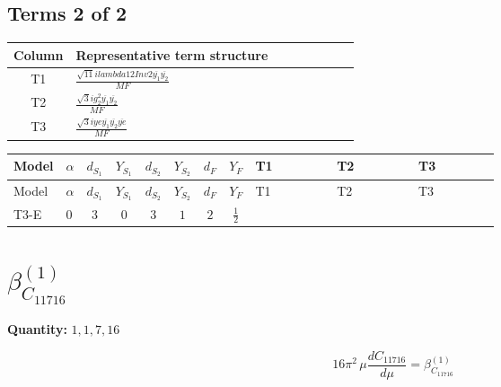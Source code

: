 \documentclass[8pt]{article}
\begin{document}
\begin{landscape}
\subsection*{Terms 2 of 2}
\begin{center}
\begin{tabular}{@{}c >{\raggedright\arraybackslash}p{0.82\linewidth}@{}}
\toprule
Column & Representative term structure \\
\midrule
T1 & \(\displaystyle \frac{\sqrt{11} i lambda12Inv2 \overline{y_{1}} \overline{y_{2}}}{MF}\) \\
\midrule
T2 & \(\displaystyle \frac{\sqrt{3} i g_{2}^{2} \overline{y_{1}} \overline{y_{2}}}{MF}\) \\
\midrule
T3 & \(\displaystyle \frac{\sqrt{3} i ye \overline{y_{1}} \overline{y_{2}} \overline{ye}}{MF}\) \\
\midrule
\bottomrule
\end{tabular}
\end{center}
\smallskip
\tiny
\begin{longtable}{@{}llcccccc >{\raggedright\arraybackslash}p{0.21\linewidth} >{\raggedright\arraybackslash}p{0.21\linewidth} >{\raggedright\arraybackslash}p{0.21\linewidth}@{}}
\toprule
Model & $\alpha$ & $d_{S_1}$ & $Y_{S_1}$ & $d_{S_2}$ & $Y_{S_2}$ & $d_F$ & $Y_F$ & T1 & T2 & T3 \\
\midrule
\endfirsthead
\toprule
Model & $\alpha$ & $d_{S_1}$ & $Y_{S_1}$ & $d_{S_2}$ & $Y_{S_2}$ & $d_F$ & $Y_F$ & T1 & T2 & T3 \\
\midrule
\endhead
T3-E & $0$ & $3$ & $0$ & $3$ & $1$ & $2$ & $\frac{1}{2}$ & \scriptsize\adjustbox{max width=\linewidth}{$\begin{gathered} \frac{3 \sqrt{11} i lambda12Inv2 \overline{y_{1}} \overline{y_{2}}}{22 MF}\end{gathered}$} & \scriptsize\adjustbox{max width=\linewidth}{$\begin{gathered} \frac{11 \sqrt{3} i g_{2}^{2} \overline{y_{1}} \overline{y_{2}}}{8 MF}\end{gathered}$} & \scriptsize\adjustbox{max width=\linewidth}{$\begin{gathered} - \frac{\sqrt{3} i ye \overline{y_{1}} \overline{y_{2}} \overline{ye}}{12 MF}\end{gathered}$} \\
\midrule
\bottomrule
\end{longtable}
\clearpage
\section*{$\beta_{C_{11716}}^{(1)}$}
\noindent\textbf{Quantity: }$\mathrm{1,1,7,16}$\par\smallskip
\[16\pi^2\,\mu\frac{d C_{11716}}{d\mu}=\beta_{C_{11716}}^{(1)}\]

\end{landscape}
\end{document}
